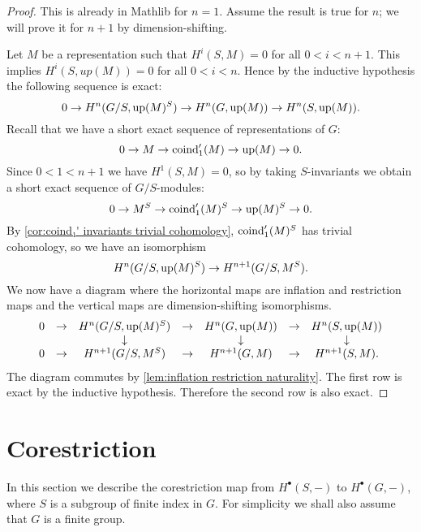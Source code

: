 \begin{proof}
	This is already in Mathlib for $n=1$.
	Assume the result is true for $n$; we will prove it for $n+1$
	by dimension-shifting.

	Let $M$ be a representation such that $H^i(S,M)=0$ for all $0 < i < n+1$.
	This implies $H^i(S,up(M)) = 0$ for all $0 < i < n$.
	Hence by the inductive hypothesis the following sequence is exact:
	\[
		0 \to H^n( G/S, \mathrm{up}(M)^S) \to H^n(G, \mathrm{up}(M)) \to H^n(S,\mathrm{up}(M)).
	\]
	Recall that we have a short exact sequence of representations of $G$:
	\[
		0 \to M \to \mathrm{coind}_1'(M) \to \mathrm{up}(M) \to 0.
	\]
	Since $0 < 1 < n+1$ we have $H^1(S,M)=0$,
	so by taking $S$-invariants we obtain a short exact sequence of
	$G/S$-modules:
	\[
		0 \to M^S \to \mathrm{coind}_1'(M)^S \to \mathrm{up}(M)^S \to 0.
	\]
	By \ref{cor:coind₁' invariants trivial cohomology}, $\mathrm{coind}_1'(M)^S$ has trivial cohomology,
	so we have an isomorphism
	\[
		 H^n(G/S, \mathrm{up}(M)^S) \to H^{n+1}(G/S, M^S).
	\]
	We now have a diagram where the horizontal maps are inflation and restriction maps
	and the vertical maps are dimension-shifting isomorphisms.
	\[
		\begin{matrix}
			0 &\to& H^{n}(G/S, \mathrm{up}(M)^S) &\to &H^{n}(G,\mathrm{up}(M)) & \to & H^n(S,\mathrm{up}(M)) \\
			  &   &   \downarrow              &    &  \downarrow         &     &  \downarrow  \\
			0 &\to& H^{n+1}(G/S, M^S) &\to &H^{n+1}(G,M) & \to & H^{n+1}(S,M).
		\end{matrix}
	\]
	The diagram commutes by \ref{lem:inflation restriction naturality}.
	The first row is exact by the inductive hypothesis.
	Therefore the second row is also exact.
\end{proof}





\section{Corestriction}

In this section we describe the corestriction map from $H^\bullet (S,-)$ to $H^\bullet(G,-)$,
where $S$ is a subgroup of finite index in $G$.
For simplicity we shall also assume that $G$ is a finite group.

